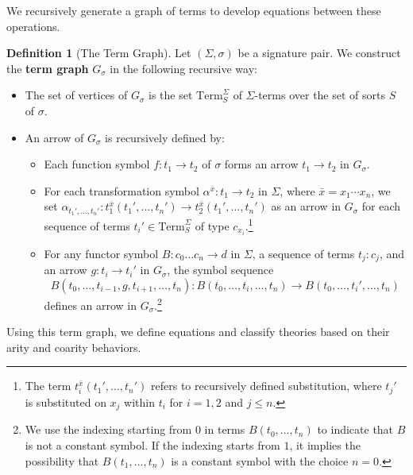 \documentclass[11pt]{article}
\theoremstyle{plain}
\theoremstyle{definition}
\newtheorem{definition}[theorem]{Definition}
\numberwithin{equation}{section}
\begin{document}
We recursively generate a graph of terms to develop equations between these operations.

\begin{definition}[The Term Graph]
   Let $(\Sigma,\sigma)$ be a signature pair. We construct the \textbf{term graph} $G_\sigma$ in the following recursive way:
   \begin{itemize}
       \item The set of vertices of $G_\sigma$ is the set $\mathrm{Term}^\Sigma_S$ of $\Sigma$-terms over the set of sorts $S$ of $\sigma$.
       \item An arrow of $G_\sigma$ is recursively defined by:
       \begin{itemize}
           \item Each function symbol $f \colon t_1 \to t_2$ of $\sigma$ forms an arrow $t_1 \to t_2$ in $G_\sigma$. 
           \item For each transformation symbol $\alpha^{\bar{x}} \colon t_1 \to t_2$ in $\Sigma$, where $\bar{x} = x_1\cdots x_n$, we set $\alpha_{t_1',\dots, t_n'} \colon t_1^{\bar{x}}(t_1',\dots, t_n') \to t_2^{\bar{x}}(t_1',\dots, t_n')$ as an arrow in $G_\sigma$ for each sequence of terms $t_i' \in \mathrm{Term}_S^\Sigma$ of type $c_{x_i}$.\footnote{The term $t_i^{\bar{x}}(t_1',\ldots, t_n')$ refers to recursively defined substitution, where $t_j'$ is substituted on $x_j$ within $t_i$ for $i = 1,2$ and $j\leq n$.}
           \item For any functor symbol $B \colon c_0\dots c_n \to d$ in $\Sigma$, a sequence of terms $t_j \colon c_j$, and an arrow $g \colon t_i \to t_i'$ in $G_\sigma$, the symbol sequence 
           $$
           B(t_0,\dots, t_{i-1}, g, t_{i+1}, \dots, t_n) \colon B(t_0,\dots, t_i, \dots, t_n) \to B(t_0,\dots, t_i', \dots, t_n)
           $$
           defines an arrow in $G_\sigma$.\footnote{We use the indexing starting from $0$ in terms $B(t_0,\ldots, t_n)$ to indicate that $B$ is not a constant symbol. If the indexing starts from $1$, it implies the possibility that $B(t_1,\ldots, t_n)$ is a constant symbol with the choice $n = 0$.}
       \end{itemize}
   \end{itemize}
\end{definition}

Using this term graph, we define equations and classify theories based on their arity and coarity behaviors.
\end{document}
